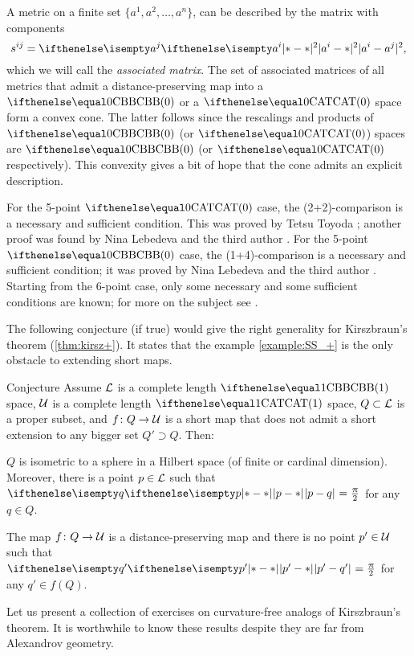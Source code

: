 A metric on a finite set $\{a^1,a^2,\dots,a^n\}$,
can be described by the matrix with components
\[s^{ij}
=
\dist[2]{a^i}{a^j}{},\]
which we will call the \emph{associated matrix}.
The set of associated matrices of all metrics that admit a distance-preserving map into a $\Alex{0}$ or a $\CAT{0}$ space 
form a convex cone. 
The latter follows since the rescalings and products of $\Alex{0}$ (or $\CAT{0}$) spaces are $\Alex{0}$ (or $\CAT{0}$ respectively).
This convexity gives a bit of hope that the cone admits an explicit description.

For the 5-point $\CAT{0}$ case, the (2+2)-comparison is a necessary and sufficient condition.
This was proved by Tetsu Toyoda \cite{toyoda};
another proof was found by Nina Lebedeva and the third author \cite{lebedeva-petrunin:toyoda}.
For the 5-point $\Alex{0}$ case, the (1+4)-comparison is a necessary and sufficient condition;
it was proved by Nina Lebedeva and the third author \cite{lebedeva-petrunin:5CBB}.
Starting from the 6-point case, only some necessary and some sufficient conditions are known;
for more on the subject see \cite{alexander-kapovitch-kirszbraun, lebedeva-petrunin:toyoda, lebedeva-petrunin-zolotov}.

The following conjecture (if true) would give the right generality for Kirszbraun's theorem (\ref{thm:kirsz+}).
It states that the example \ref{example:SS_+} 
is the only obstacle to extending short maps.

\begin{thm}{Conjecture}\label{conj:kirsz}
Assume $\mathcal{L}$ is a complete length $\Alex1$ space,
$\mathcal{U}$ is a complete length $\CAT1$ space,
$Q\subset \spc{L}$ is a proper subset,
and $f\: Q\to\spc{U}$ is a short map that does not admit a short extension to any bigger set $Q'\supset Q$. 
Then: 

\begin{subthm}{}
$Q$ is isometric to a sphere in a Hilbert space (of finite or cardinal dimension).
Moreover, there is a point $p\in \spc{L}$ such that $\dist{p}{q}{}=\tfrac{\pi}{2}$ for any $q\in Q$.
\end{subthm}

\begin{subthm}{}
The map $f\:Q\to\spc{U}$ is a distance-preserving map and there is no point $p'\in \spc{U}$ such that $\dist{p'}{q'}{}=\tfrac{\pi}{2}$ for any $q'\in f(Q)$.
\end{subthm}
\end{thm}

Let us present a collection of exercises on curvature-free analogs of Kirszbraun's theorem.
It is worthwhile to know these results despite they are far from Alexandrov geometry.

